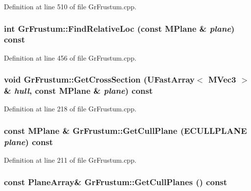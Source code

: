 \begin{CompactItemize}
Definition at line 510 of file GrFrustum.cpp.\hypertarget{class_gr_frustum_fa16710ead0525507d2f259836fd1c2c}{
\subsubsection[{FindRelativeLoc}]{\setlength{\rightskip}{0pt plus 5cm}int GrFrustum::FindRelativeLoc (const {\bf MPlane} \& {\em plane}) const}}
\label{class_gr_frustum_fa16710ead0525507d2f259836fd1c2c}




Definition at line 456 of file GrFrustum.cpp.\hypertarget{class_gr_frustum_ea6dd0973f8c4f3c5ca802b4344ceb39}{
\subsubsection[{GetCrossSection}]{\setlength{\rightskip}{0pt plus 5cm}void GrFrustum::GetCrossSection ({\bf UFastArray}$<$ {\bf MVec3} $>$ \& {\em hull}, \/  const {\bf MPlane} \& {\em plane}) const}}
\label{class_gr_frustum_ea6dd0973f8c4f3c5ca802b4344ceb39}




Definition at line 218 of file GrFrustum.cpp.\hypertarget{class_gr_frustum_5727c08f1f0aba8e892df0bf07f9e4d9}{
\subsubsection[{GetCullPlane}]{\setlength{\rightskip}{0pt plus 5cm}const {\bf MPlane} \& GrFrustum::GetCullPlane ({\bf ECULLPLANE} {\em plane}) const}}
\label{class_gr_frustum_5727c08f1f0aba8e892df0bf07f9e4d9}




Definition at line 211 of file GrFrustum.cpp.\hypertarget{class_gr_frustum_f95c1cb46f5234b2ac7428cb40610564}{
\subsubsection[{GetCullPlanes}]{\setlength{\rightskip}{0pt plus 5cm}const {\bf PlaneArray}\& GrFrustum::GetCullPlanes () const}}
\label{class_gr_frustum_f95c1cb46f5234b2ac7428cb40610564}





\end{CompactItemize}
